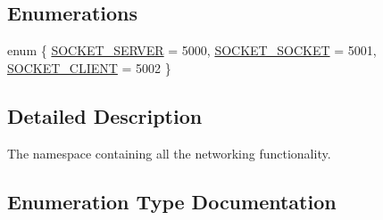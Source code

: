 \subsection*{Enumerations}
\begin{DoxyCompactItemize}
\item 
enum \{ \hyperlink{namespace_rad_j_a_v_1_1_networking_a9835cabf529b549093bd0c7048bada48a84a07e932f5c2b0454a13e10f15e4103}{S\+O\+C\+K\+E\+T\+\_\+\+S\+E\+R\+V\+ER} = 5000, 
\hyperlink{namespace_rad_j_a_v_1_1_networking_a9835cabf529b549093bd0c7048bada48a35e69c9623c550c84a5b2ba52ea3af2d}{S\+O\+C\+K\+E\+T\+\_\+\+S\+O\+C\+K\+ET} = 5001, 
\hyperlink{namespace_rad_j_a_v_1_1_networking_a9835cabf529b549093bd0c7048bada48a11c51975fabad7dd57dc8c5aee4d95c1}{S\+O\+C\+K\+E\+T\+\_\+\+C\+L\+I\+E\+NT} = 5002
 \}
\end{DoxyCompactItemize}


\subsection{Detailed Description}
The namespace containing all the networking functionality. 

\subsection{Enumeration Type Documentation}
